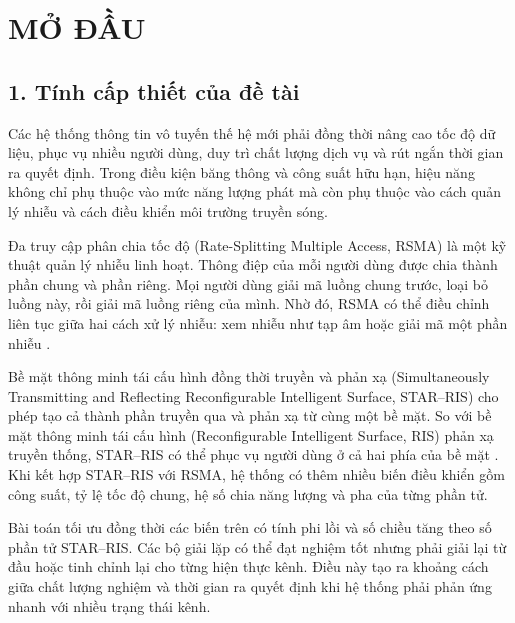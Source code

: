 \chapter*{MỞ ĐẦU}

\section*{1. Tính cấp thiết của đề tài}
Các hệ thống thông tin vô tuyến thế hệ mới phải đồng thời nâng cao tốc độ dữ liệu, phục vụ nhiều người dùng, duy trì chất lượng dịch vụ và rút ngắn thời gian ra quyết định. Trong điều kiện băng thông và công suất hữu hạn, hiệu năng không chỉ phụ thuộc vào mức năng lượng phát mà còn phụ thuộc vào cách quản lý nhiễu và cách điều khiển môi trường truyền sóng.

Đa truy cập phân chia tốc độ (Rate-Splitting Multiple Access, RSMA) là một kỹ thuật quản lý nhiễu linh hoạt. Thông điệp của mỗi người dùng được chia thành phần chung và phần riêng. Mọi người dùng giải mã luồng chung trước, loại bỏ luồng này, rồi giải mã luồng riêng của mình. Nhờ đó, RSMA có thể điều chỉnh liên tục giữa hai cách xử lý nhiễu: xem nhiễu như tạp âm hoặc giải mã một phần nhiễu \cite{Mao2018RSMABridging,Mao2022RSMAFundamentals}.

Bề mặt thông minh tái cấu hình đồng thời truyền và phản xạ (Simultaneously Transmitting and Reflecting Reconfigurable Intelligent Surface, STAR--RIS) cho phép tạo cả thành phần truyền qua và phản xạ từ cùng một bề mặt. So với bề mặt thông minh tái cấu hình (Reconfigurable Intelligent Surface, RIS) phản xạ truyền thống, STAR--RIS có thể phục vụ người dùng ở cả hai phía của bề mặt \cite{Xu2021STARRIS,Mu2021STARAided}. Khi kết hợp STAR--RIS với RSMA, hệ thống có thêm nhiều biến điều khiển gồm công suất, tỷ lệ tốc độ chung, hệ số chia năng lượng và pha của từng phần tử.

Bài toán tối ưu đồng thời các biến trên có tính phi lồi và số chiều tăng theo số phần tử STAR--RIS. Các bộ giải lặp có thể đạt nghiệm tốt nhưng phải giải lại từ đầu hoặc tinh chỉnh lại cho từng hiện thực kênh. Điều này tạo ra khoảng cách giữa chất lượng nghiệm và thời gian ra quyết định khi hệ thống phải phản ứng nhanh với nhiều trạng thái kênh.

